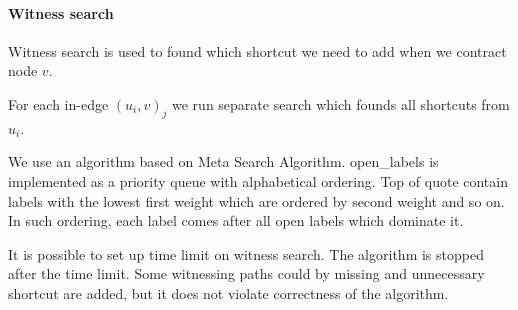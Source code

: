 \paragraph*{Witness search}

Witness search is used to found which shortcut we need to add when we contract 
node $v$.

For each in-edge $(u_i,v)_j$ we run separate search which founds all shortcuts 
from $u_i$.

We use an algorithm based on Meta Search Algorithm. 
open\_labels 
is implemented as a priority queue with alphabetical ordering. Top of quote contain labels with the lowest first weight which are ordered by second weight and so on. 
In such ordering, each label comes after all open labels which dominate it.

It is possible to set up time limit on witness search. The algorithm is stopped after the time limit. Some witnessing paths could by missing and unnecessary shortcut are added, but it does not violate correctness of the algorithm.
